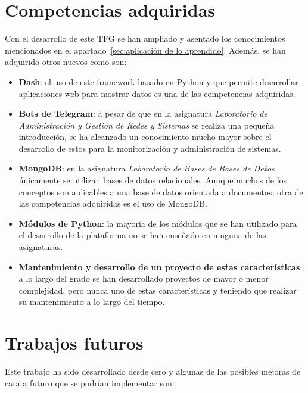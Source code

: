\documentclass[a4paper, 12pt, oneside]{book}
\begin{document}
\section{Competencias adquiridas}
\label{sec:competencias adquiridas}

Con el desarrollo de este TFG se han ampliado y asentado los conocimientos mencionados en el apartado~\ref{sec:aplicación de lo aprendido}. Además, se han adquirido otros nuevos como son:

\begin{itemize}
\item \textbf{Dash}: el uso de este framework basado en Python y que permite desarrollar aplicaciones web para mostrar datos es una de las competencias adquiridas.

\item \textbf{Bots de Telegram}: a pesar de que en la asignatura \textit{Laboratorio de Administración y Gestión de Redes y Sistemas} se realiza una pequeña introducción, se ha alcanzado un conocimiento mucho mayor sobre el desarrollo de estos para la monitorización y administración de sistemas.

\item \textbf{MongoDB}: en la asignatura \textit{Laboratorio de Bases de Bases de Datos} únicamente se utilizan bases de datos relacionales. Aunque muchos de los conceptos son aplicables a una base de datos orientada a documentos, otra de las competencias adquiridas es el uso de MongoDB.

\item \textbf{Módulos de Python}: la mayoría de los módulos que se han utilizado para el desarrollo de la plataforma no se han enseñado en ninguna de las asignaturas. 

\item \textbf{Mantenimiento y desarrollo de un proyecto de estas características}: a lo largo del grado se han desarrollado proyectos de mayor o menor complejidad, pero nunca uno de estas características y teniendo que realizar su mantenimiento a lo largo del tiempo.

\end{itemize}


\section{Trabajos futuros}
\label{sec:trabajos futuros}

Este trabajo ha sido desarrollado desde cero y algunas de las posibles mejoras de cara a futuro que se podrían implementar son:
\end{document}
